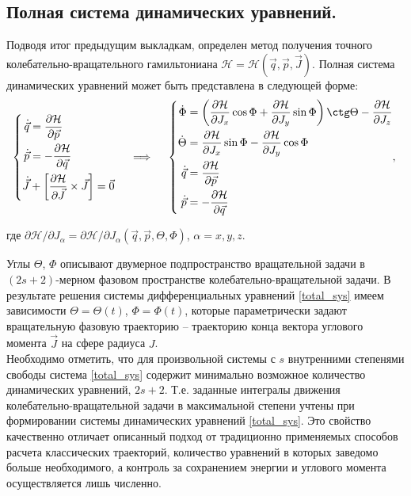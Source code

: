\subsection{Полная система динамических уравнений.}

Подводя итог предыдущим выкладкам, определен метод получения точного колебательно-вращательного гамильтониана $\mathcal{H} = \mathcal{H} (\vec{q}, \vec{p}, \vec{J})$. Полная система динамических уравнений может быть представлена в следующей форме:
\vverh
\begin{gather}
\left\{
\begin{aligned}
\dot{\vec{q}} &= \frac{\partial \mathcal{H}}{\partial \vec{p}} \\
\dot{\vec{p}} &= - \frac{\partial \mathcal{H}}{\partial \vec{q}} \\
\dot{\vec{J}} &+ \left[ \frac{\partial \mathcal{H}}{\partial \vec{J}} \times \vec{J} \right] = \vec{0}  
\end{aligned}
\right.
\quad \implies \quad
\left\{
\begin{aligned}
\dot{\Phi} &= \lb \frac{\partial \mathcal{H}}{\partial J_x} \cos \Phi + \frac{\partial \mathcal{H}}{\partial J_y} \sin \Phi \rb \ctg \Theta - \frac{\partial \mathcal{H}}{\partial J_z} \\
\dot{\Theta} &= \frac{\partial \mathcal{H}}{\partial J_x} \sin \Phi - \frac{\partial \mathcal{H}}{\partial J_y} \cos \Phi \\
\dot{\vec{q}} &= \frac{\partial \mathcal{H}}{\partial \vec{p}} \\
\dot{\vec{p}} &= - \frac{\partial \mathcal{H}}{\partial \vec{q}}
\end{aligned},
\right. \label{total_sys}
\end{gather}

\vlevo где $\partial \mathcal{H} / \partial J_\alpha = \partial \mathcal{H} / \partial J_\alpha (\vec{q}, \vec{p}, \Theta, \Phi)$, $\alpha = x,y,z$.

Углы $\Theta$, $\Phi$ описывают двумерное подпространство вращательной задачи в $(2s+2)$-мерном фазовом пространстве колебательно-вращательной задачи. В результате решения системы дифференциальных уравнений \eqref{total_sys} имеем зависимости $\Theta = \Theta(t)$, $\Phi = \Phi(t)$, которые параметрически задают вращательную фазовую траекторию -- траекторию конца вектора углового момента $\vec{J}$ на сфере радиуса $J$.\\
Необходимо отметить, что для произвольной системы с $s$ внутренними степенями свободы система \eqref{total_sys} содержит минимально возможное количество динамических уравнений, $2s+2$. Т.е. заданные интегралы движения колебательно-вращательной задачи в максимальной степени учтены при формировании системы динамических уравнений \eqref{total_sys}. Это свойство качественно отличает описанный подход от традиционно применяемых способов расчета классических траекторий, количество уравнений в которых заведомо больше необходимого, а контроль за сохранением энергии и углового момента осуществляется лишь численно. 

